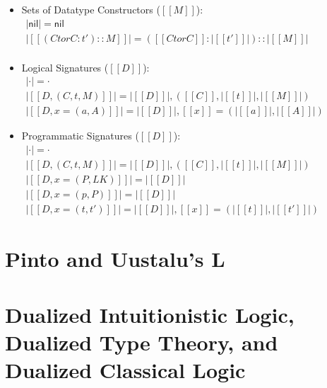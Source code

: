 \documentclass[phd,appendix,dedicationpage,ackpage,epigraphpage]{uithesis}
\begin{document}
\begin{definition}
\begin{itemize}
  \item Sets of Datatype Constructors ($[[M]]$):\\
    \begin{math}
      \begin{array}{lll}
        |\mathsf{nil}| = \mathsf{nil}\\
        |[[(Ctor C : t') :: M]]| = ([[Ctor C]] : |[[t']]|)::|[[M]]| \\
      \end{array}
    \end{math}
    
  \item Logical Signatures ($[[D]]$):\\
    \begin{math}
      \begin{array}{lll}
        |\cdot| = \cdot\\
        |[[D , ( C , t , M )]]| = |[[D]]|, ([[C]], |[[t]]|, |[[M]]|)\\
        |[[D , x = ( a , A )]]| = |[[D]]| , [[x]] = ( |[[a]]| , |[[A]]| )
      \end{array}
    \end{math}

  \item Programmatic Signatures ($[[D]]$):\\
    \begin{math}
      \begin{array}{lll}
        |\cdot| = \cdot\\
        |[[D , ( C , t , M )]]| = |[[D]]|, ([[C]], |[[t]]|, |[[M]]|)\\
        |[[D , x = ( P , LK )]]| = |[[D]]|\\
        |[[D , x = ( p , P )]]| = |[[D]]|\\
        |[[D , x = ( t , t' )]]| = |[[D]]| , [[x]] = ( |[[t]]| , |[[t']]| )
      \end{array}
    \end{math}
  \end{itemize}
\end{definition}

\newpage
\section{Pinto and Uustalu's L}
\label{sec:pinto_and_uustalu's_l}
\Lall{}

\newpage
\section{Dualized Intuitionistic Logic, Dualized Type Theory, and
  Dualized Classical Logic}
\label{sec:dualized_intuitionistic_logic}
\dttall{}



\end{document}

